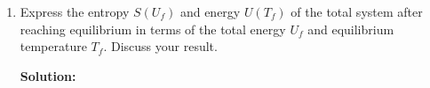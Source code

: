 \documentclass[10pt]{article}
\newenvironment{Solution}
    {\textbf{Solution:}
    
    \vspace{5mm}
    \begin{tcolorbox}
    }
    {
    \end{tcolorbox}
    \vspace{5mm}
    }
\begin{document}
\begin{enumerate}
\begin{enumerate}
\begin{Solution}
\end{Solution}

\item Express the entropy $S\left(U_{f}\right)$ and energy $U\left(T_{f}\right)$ of the total system after reaching equilibrium in terms of the total energy $U_{f}$ and equilibrium temperature $T_{f} .$ Discuss your result.

\begin{Solution}


\end{Solution}
    
\end{enumerate}
\end{enumerate}
\end{document}

